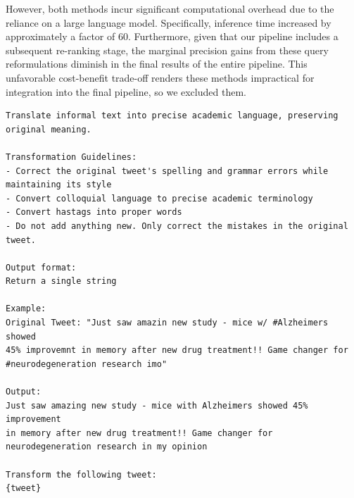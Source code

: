However, both methods incur significant computational overhead due to the reliance on a large language model. Specifically, inference time increased by approximately a factor of 60. Furthermore, given that our pipeline includes a subsequent re-ranking stage, the marginal precision gains from these query reformulations diminish in the final results of the entire pipeline. This unfavorable cost-benefit trade-off renders these methods impractical for integration into the final pipeline, so we excluded them.


\begin{center}
\begin{minipage}{0.8\linewidth}
\begin{lstlisting}[style=promptstyle, caption={Prompt template to rewrite a social media post.}, label={lst:rewrite_prompt}]
Translate informal text into precise academic language, preserving
original meaning.

Transformation Guidelines:
- Correct the original tweet's spelling and grammar errors while maintaining its style
- Convert colloquial language to precise academic terminology
- Convert hastags into proper words
- Do not add anything new. Only correct the mistakes in the original tweet.

Output format:
Return a single string

Example:
Original Tweet: "Just saw amazin new study - mice w/ #Alzheimers showed
45% improvemnt in memory after new drug treatment!! Game changer for
#neurodegeneration research imo"

Output:
Just saw amazing new study - mice with Alzheimers showed 45% improvement
in memory after new drug treatment!! Game changer for
neurodegeneration research in my opinion

Transform the following tweet:
{tweet}
\end{lstlisting}
\end{minipage}
\end{center}


